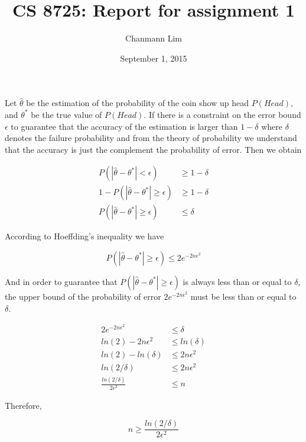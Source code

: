 \documentclass[a4paper]{article}
\begin{document}
\title{CS 8725: Report for assignment 1}
\author{Chanmann Lim}
\date{September 1, 2015}
\maketitle

Let $\hat{\theta}$ be the estimation of the probability of the coin show up head $P(Head)$, and $\theta^*$ be the true value of $P(Head)$. If there is a constraint on the error bound $\epsilon$ to guarantee that the accuracy of the estimation is larger than $1 - \delta$ where $\delta$ denotes the failure probability and from the theory of probability we understand that the accuracy is just the complement the probability of error. Then we obtain

\begin{align}
P(|\hat{\theta} - \theta^*| < \epsilon) &\ge 1 - \delta \\
1 - P(|\hat{\theta} - \theta^*| \ge \epsilon) &\ge 1 - \delta \\
P(|\hat{\theta} - \theta^*| \ge \epsilon) &\le \delta
\end{align}

According to Hoeffding's inequality we have

\begin{equation}
P(|\hat{\theta} - \theta^*| \ge \epsilon) \le 2e^{-2n\epsilon^2}
\end{equation}

And in order to guarantee that $P(|\hat{\theta} - \theta^*| \ge \epsilon)$ is always less than or equal to $\delta$, the upper bound of the probability of error $2e^{-2n\epsilon^2}$ must be less than or equal to $\delta$.

\begin{align*}
2e^{-2n\epsilon^2} &\le \delta \\
ln(2) - 2n\epsilon^2 &\le ln(\delta) \\
ln(2) - ln(\delta) &\le 2n\epsilon^2 \\
ln(2/\delta) &\le 2n\epsilon^2 \\
\frac{ln(2/\delta)}{2\epsilon^2} &\le n
\end{align*}

Therefore,

\begin{displaymath}
n \ge \frac{ln(2/\delta)}{2\epsilon^2}
\end{displaymath}
\end{document}
